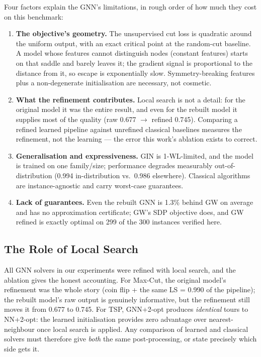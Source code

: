 \documentclass[11pt]{article}
\begin{document}
Four factors explain the GNN's limitations, in rough order of how much they cost on this benchmark:
\begin{enumerate}
    \item \textbf{The objective's geometry.} The unsupervised cut loss is quadratic around the uniform output, with an exact critical point at the random-cut baseline. A model whose features cannot distinguish nodes (constant features) starts on that saddle and barely leaves it; the gradient signal is proportional to the distance from it, so escape is exponentially slow. Symmetry-breaking features plus a non-degenerate initialisation are necessary, not cosmetic.
    \item \textbf{What the refinement contributes.} Local search is not a detail: for the original model it was the entire result, and even for the rebuilt model it supplies most of the quality (raw 0.677 $\to$ refined 0.745). Comparing a refined learned pipeline against unrefined classical baselines measures the refinement, not the learning --- the error this work's ablation exists to correct.
    \item \textbf{Generalisation and expressiveness.} GIN is 1-WL-limited, and the model is trained on one family/size; performance degrades measurably out-of-distribution (0.994 in-distribution vs.\ 0.986 elsewhere). Classical algorithms are instance-agnostic and carry worst-case guarantees.
    \item \textbf{Lack of guarantees.} Even the rebuilt GNN is 1.3\% behind GW on average and has no approximation certificate; GW's SDP objective does, and GW refined is exactly optimal on 299 of the 300 instances verified here.
\end{enumerate}

\subsection{The Role of Local Search}

All GNN solvers in our experiments were refined with local search, and the ablation gives the honest accounting.
For Max-Cut, the original model's refinement was the whole story (coin flip + the same LS = 0.990 of the pipeline); the rebuilt model's raw output is genuinely informative, but the refinement still moves it from 0.677 to 0.745.
For TSP, GNN+2-opt produces \emph{identical} tours to NN+2-opt: the learned initialisation provides zero advantage over nearest-neighbour once local search is applied.
Any comparison of learned and classical solvers must therefore give \emph{both} the same post-processing, or state precisely which side gets it.
\end{document}
